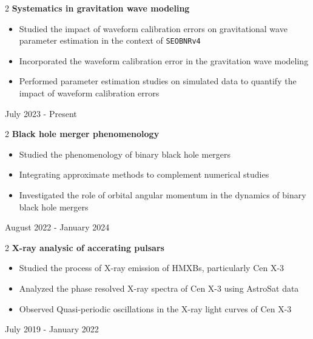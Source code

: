 \documentclass[10pt, letterpaper]{article}
\newenvironment{highlights}{
    \begin{itemize}[
        topsep=0.10 cm,
        parsep=0.10 cm,
        partopsep=0pt,
        itemsep=0pt,
        leftmargin=0.4 cm + 10pt
    ]
}{
    \end{itemize}
}
\newenvironment{twocolentry}[2][]{
    \onecolentry
    \def\secondColumn{#2}
    \setcolumnwidth{\fill, 4.5 cm}
    \begin{paracol}{2}
}{
    \switchcolumn \raggedleft \secondColumn
    \end{paracol}
    \endonecolentry
}
\begin{document}
\vspace{0.2 cm}

\begin{twocolentry}{July 2023 - Present}{\textbf{Systematics in gravitation wave modeling}}
    \begin{highlights}
        \item Studied the impact of waveform calibration errors on gravitational wave parameter estimation in the context of \texttt{SEOBNRv4}
        \item Incorporated the waveform calibration error in the gravitation wave modeling
        \item Performed parameter estimation studies on simulated data to quantify the impact of waveform calibration errors
    \end{highlights}
\end{twocolentry}

\vspace{0.2 cm}

\begin{twocolentry}{August 2022 - January 2024}{\textbf{Black hole merger phenomenology}}
    \begin{highlights}
        \item Studied the phenomenology of binary black hole mergers
        \item Integrating approximate methods to complement numerical studies
        \item Investigated the role of orbital angular momentum in the dynamics of binary black hole mergers
    \end{highlights}
\end{twocolentry}

\vspace{0.2 cm}

\begin{twocolentry}{July 2019 - January 2022}{\textbf{X-ray analysic of accerating pulsars}}
    \begin{highlights}
        \item Studied the process of X-ray emission of HMXBs, particularly Cen X-3
        \item Analyzed the phase resolved X-ray spectra of Cen X-3 using AstroSat data
        \item Observed Quasi-periodic oscillations in the X-ray light curves of Cen X-3
    \end{highlights}
\end{twocolentry}

\end{document}
